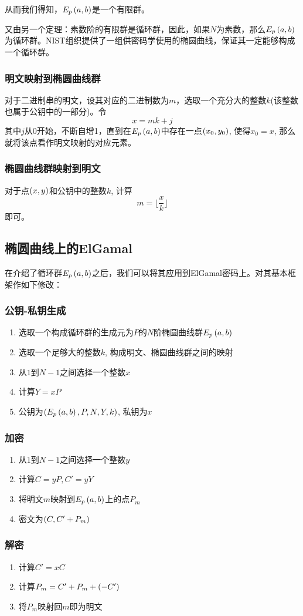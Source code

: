 从而我们得知，$E_p\left( {a, b}\right)$是一个有限群。\par
又由另一个定理：素数阶的有限群是循环群，因此，如果$N$为素数，那么$E_p\left( {a, b}\right)$为循环群。NIST组织提供了一组供密码学使用的椭圆曲线，保证其一定能够构成一个循环群。
\subsubsection{明文映射到椭圆曲线群}
对于二进制串的明文，设其对应的二进制数为$m$，选取一个充分大的整数$k$(该整数也属于公钥中的一部分)。令
\[x=mk+j\]
其中$j$从0开始，不断自增1，直到在$E_p\left( {a, b}\right)$中存在一点$\left( {x_0, y_0}\right)$, 使得$x_0=x$, 那么就将该点看作明文映射的对应元素。
\subsubsection{椭圆曲线群映射到明文}
对于点$\left( {x, y}\right)$和公钥中的整数$k$, 计算
\[m=\lfloor \frac{x}{k} \rfloor\]
即可。
\subsection{椭圆曲线上的ElGamal}
在介绍了循环群$E_p\left( {a, b}\right)$之后，我们可以将其应用到ElGamal密码上。对其基本框架作如下修改：
\subsubsection{公钥-私钥生成}
\begin{enumerate}
	\item 选取一个构成循环群的生成元为$P$的$N$阶椭圆曲线群$E_p\left( {a, b}\right)$
	\item 选取一个足够大的整数$k$, 构成明文、椭圆曲线群之间的映射
	\item 从$1$到$N-1$之间选择一个整数$x$
	\item 计算$Y=xP$
	\item 公钥为$\left( {E_p\left( {a, b}\right), P, N, Y, k}\right)$, 私钥为$x$
\end{enumerate}
\subsubsection{加密}
\begin{enumerate}
	\item 从$1$到$N-1$之间选择一个整数$y$
	\item 计算$C=yP, C'=yY$
	\item 将明文$m$映射到$E_p\left( {a, b}\right)$上的点$P_m$
	\item 密文为$\left( {C, C'+P_m}\right)$
\end{enumerate}
\subsubsection{解密}
\begin{enumerate}
	\item 计算$C'=xC$
	\item 计算$P_m=C'+P_m+\left( {-C'}\right)$
	\item 将$P_m$映射回$m$即为明文
\end{enumerate}